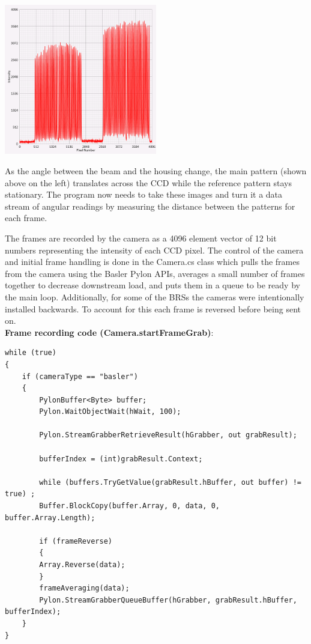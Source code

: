 \documentclass{article}
\begin{document}
\begin{center}
\includegraphics[width=0.5\textwidth]{BRSReadoutScreenPatterns.png}\\
\end{center}

As the angle between the beam and the housing change, the main pattern (shown above on the left) translates across the CCD while the reference pattern stays stationary. The program now needs to take these images and turn it a data stream of angular readings by measuring the distance between the patterns for each frame.

The frames are recorded by the camera as a 4096 element vector of 12 bit numbers representing the intensity of each CCD pixel. The control of the camera and initial frame handling is done in the Camera.cs class which pulls the frames from the camera using the Basler Pylon APIs, averages a small number of frames together to decrease downstream load, and puts them in a queue to be ready by the main loop. Additionally, for some of the BRSs the cameras were intentionally installed backwards. To account for this each frame is reversed before being sent on.\\

\textbf{Frame recording code (Camera.startFrameGrab)}:
\begin{lstlisting}
while (true)
{
	if (cameraType == "basler")
	{
	    PylonBuffer<Byte> buffer;
	    Pylon.WaitObjectWait(hWait, 100);

	    Pylon.StreamGrabberRetrieveResult(hGrabber, out grabResult);

	    bufferIndex = (int)grabResult.Context;

	    while (buffers.TryGetValue(grabResult.hBuffer, out buffer) != true) ;
	    Buffer.BlockCopy(buffer.Array, 0, data, 0, buffer.Array.Length);

	    if (frameReverse)
	    {
		Array.Reverse(data);
	    }
	    frameAveraging(data);
	    Pylon.StreamGrabberQueueBuffer(hGrabber, grabResult.hBuffer, bufferIndex);
	}
}
\end{lstlisting}
\end{document}
